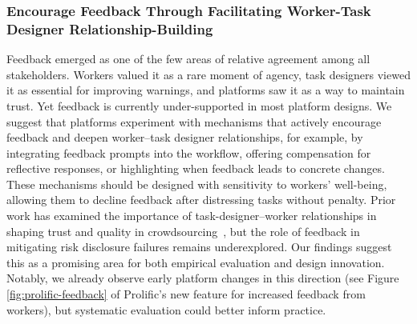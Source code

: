 \subsubsection{Encourage Feedback Through Facilitating Worker-Task Designer Relationship-Building}
Feedback emerged as one of the few areas of relative agreement among all stakeholders. Workers valued it as a rare moment of agency, task designers viewed it as essential for improving warnings, and platforms saw it as a way to maintain trust. Yet feedback is currently under-supported in most platform designs. We suggest that platforms experiment with mechanisms that actively encourage feedback and deepen worker–task designer relationships, for example, by integrating feedback prompts into the workflow, offering compensation for reflective responses, or highlighting when feedback leads to concrete changes. These mechanisms should be designed with sensitivity to workers’ well-being, allowing them to decline feedback after distressing tasks without penalty. Prior work has examined the importance of task-designer–worker relationships in shaping trust and quality in crowdsourcing~\cite{irani2013turkopticon, qian2025locating}, but the role of feedback in mitigating risk disclosure failures remains underexplored. Our findings suggest this as a promising area for both empirical evaluation and design innovation. Notably, we already observe early platform changes in this direction (see Figure \ref{fig:prolific-feedback} of Prolific's new feature for increased feedback from workers), but systematic evaluation could better inform practice. 

